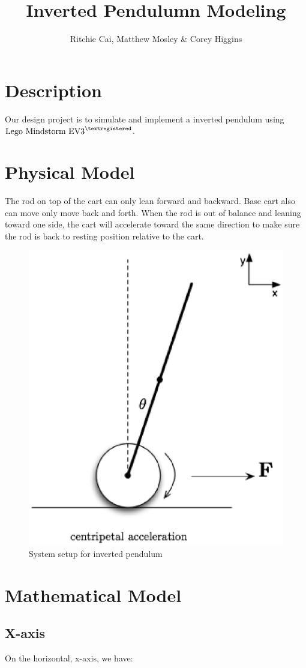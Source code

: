 \documentclass{notes}
\author{Ritchie Cai, Matthew Mosley \& Corey Higgins}
\title{Inverted Pendulumn Modeling}
\begin{document}
\maketitle 

\section{Description}
Our design project is to simulate and implement a inverted pendulum using 
$\text{Lego Mindstorm EV3}^{\textregistered}$. 

\section{Physical Model}

The rod on top of the cart can only lean forward and backward. 
Base cart also can move only move back and forth. 
When the rod is out of balance and leaning toward one side, the cart will accelerate toward the same
direction to make sure the rod is back to resting position relative to the cart.

\begin{figure}[!h]
  \begin{center}
    \includegraphics[width=2 in]{pics/Full_System_2.eps}
  \end{center}
  \caption{System setup for inverted pendulum}
  \label{fig:full_system}
\end{figure}


\section{Mathematical Model}



\subsection{X-axis}
On the horizontal, x-axis, we have:
\end{document}
